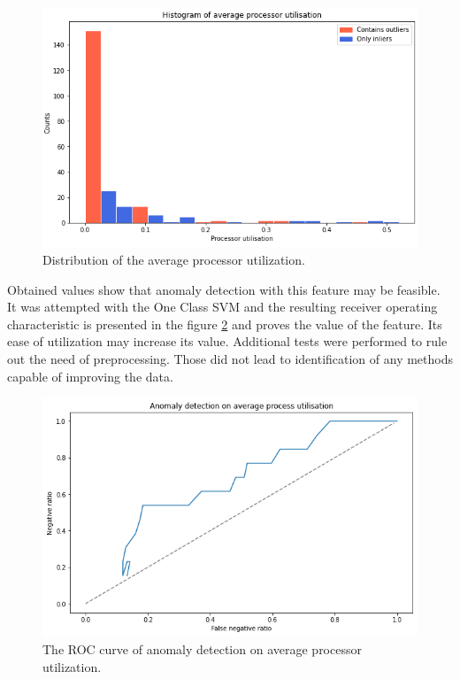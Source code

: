 \documentclass[a4paper,twoside,12pt]{book}
\begin{document}
\begin{figure}
	\centering
	\includegraphics[scale=0.9]{images/HistAvgProcs}
	\caption{Distribution of the average processor utilization.}
	\label{fig:histavgproc}
 \end{figure}

Obtained values show that anomaly detection with this feature may be feasible. It was attempted with 
the One Class SVM and the resulting receiver operating characteristic is presented in the figure
\ref{fig:procroc} and proves the value of the feature. Its ease of utilization may increase its value.
Additional tests were performed to rule out the need of preprocessing. Those did not lead to identification
of any methods capable of improving the data.

\begin{figure}
	\centering
	\includegraphics[scale=0.9]{images/ProcROCKF}
	\caption{The ROC curve of anomaly detection on average processor utilization.}
	\label{fig:procroc}
 \end{figure}
\end{document}
